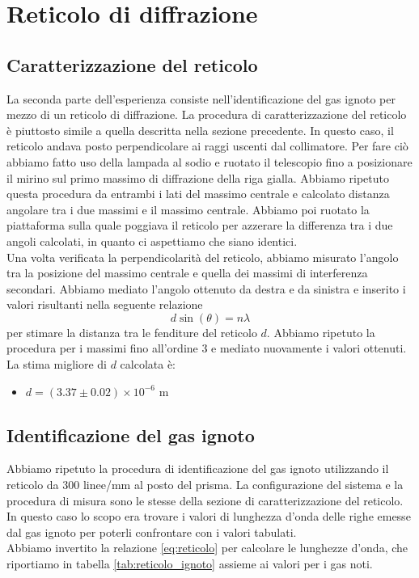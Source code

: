 \documentclass[letterpaper,12pt]{article}
\begin{document}
\section{Reticolo di diffrazione}

\subsection{Caratterizzazione del reticolo}

La seconda parte dell'esperienza consiste nell'identificazione del gas ignoto per mezzo di un reticolo di diffrazione.
La procedura di caratterizzazione del reticolo è piuttosto simile a quella descritta nella sezione precedente.
In questo caso, il reticolo andava posto perpendicolare ai raggi uscenti dal collimatore. Per fare ciò abbiamo fatto uso della lampada
al sodio e ruotato il telescopio fino a posizionare il mirino sul primo massimo di diffrazione della riga gialla.
Abbiamo ripetuto questa procedura da entrambi i lati del massimo centrale e calcolato distanza angolare tra i due massimi e il massimo centrale.
Abbiamo poi ruotato la piattaforma sulla quale poggiava il reticolo per azzerare la differenza tra i due angoli calcolati, in quanto ci aspettiamo che siano identici.\\
Una volta verificata la perpendicolarità del reticolo, abbiamo misurato l'angolo tra la posizione del massimo centrale e quella dei massimi di
interferenza secondari. Abbiamo mediato l'angolo ottenuto da destra e da sinistra e inserito i valori risultanti nella seguente relazione
\begin{equation}
    d \sin(\theta) = n \lambda
    \label{eq:reticolo}
\end{equation}
per stimare la distanza tra le fenditure del reticolo $d$. Abbiamo ripetuto la procedura per i massimi fino all'ordine 3 e mediato nuovamente
i valori ottenuti. \\
La stima migliore di $d$ calcolata è:
\begin{itemize}
    \item $d = (3.37 \pm 0.02)\times10^{-6}$ m
\end{itemize}

\subsection{Identificazione del gas ignoto}
Abbiamo ripetuto la procedura di identificazione del gas ignoto utilizzando il reticolo da 300 linee/mm al posto del 
prisma. La configurazione del sistema e la procedura di misura sono le stesse della sezione di caratterizzazione del 
reticolo. In questo caso lo scopo era trovare i valori di lunghezza d'onda delle righe emesse dal gas ignoto per poterli 
confrontare con i valori tabulati. \\
Abbiamo invertito la relazione \ref{eq:reticolo} per calcolare le lunghezze d'onda, che riportiamo in tabella \ref{tab:reticolo_ignoto} 
assieme ai valori per i gas noti.
\end{document}
